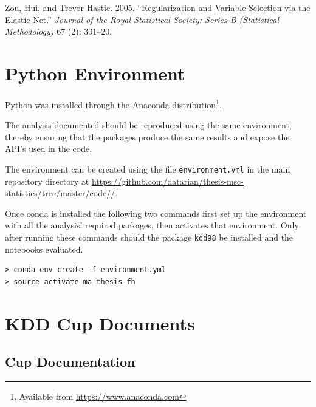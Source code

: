 \documentclass[
  11pt,
  a4paper,
  DIV=12,captions=tableheading,oneside,titlepage]{scrbook}
\begin{document}
\leavevmode\hypertarget{ref-zou2005regularization}{}%
Zou, Hui, and Trevor Hastie. 2005. ``Regularization and Variable Selection via the Elastic Net.'' \emph{Journal of the Royal Statistical Society: Series B (Statistical Methodology)} 67 (2): 301--20.

\hypertarget{appendix-appendix}{%
\appendix}


\hypertarget{python-environment}{%
\chapter{Python Environment}\label{python-environment}}

Python was installed through the Anaconda distribution\footnote{Available from \url{https://www.anaconda.com}}.

The analysis documented should be reproduced using the same environment, thereby ensuring that the packages produce the same results and expose the API's used in the code.

The environment can be created using the file \texttt{environment.yml} in the main repository directory at \url{https://github.com/datarian/thesis-msc-statistics/tree/master/code//}.

Once conda is installed the following two commands first set up the environment with all the analysis' required packages, then activates that environment. Only after running these commands should the package \texttt{kdd98} be installed and the notebooks evaluated.

\begin{verbatim}
> conda env create -f environment.yml
> source activate ma-thesis-fh
\end{verbatim}

\hypertarget{kdd-cup-documents}{%
\chapter{KDD Cup Documents}\label{kdd-cup-documents}}

\hypertarget{data-set-documentation}{%
\section{Cup Documentation}\label{data-set-documentation}}
\end{document}
